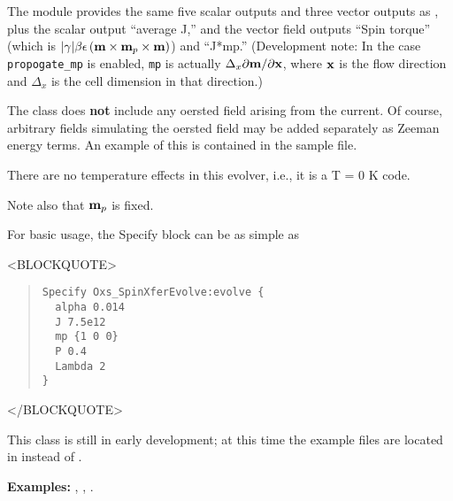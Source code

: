 \begin{description}
The  module provides the same five scalar
outputs and three vector outputs as , plus the
scalar output ``average J,'' and the vector field outputs ``Spin
torque'' (which is
$|\gamma|\beta\epsilon\left(\textbf{m}\times\textbf{m}_p\times\textbf{m}\right)$) and
``J*mp.''  (Development note: In the case \texttt{propogate\_mp} is
enabled, \texttt{mp} is actually $\Delta_x\partial\textbf{m}/\partial\textbf{x}$,
where $\textbf{x}$ is the flow direction and $\Delta_x$ is the cell dimension
in that direction.)

The  class does \textbf{not} include any oersted
field arising from the current.  Of course, arbitrary fields simulating
the oersted field may be added separately as Zeeman energy terms.  An
example of this is contained in the  sample file.

There are no temperature effects in this evolver, i.e., it is a T = 0 K
code.

Note also that $\textbf{m}_p$ is fixed.

For basic usage, the Specify block can be as simple as
\begin{rawhtml}<BLOCKQUOTE>\end{rawhtml}
\begin{quote}
\begin{verbatim}
Specify Oxs_SpinXferEvolve:evolve {
  alpha 0.014
  J 7.5e12
  mp {1 0 0}
  P 0.4
  Lambda 2
}\end{verbatim}
\end{quote}
\begin{rawhtml}</BLOCKQUOTE>\end{rawhtml}

This class is still in early development; at this time the example files
are located in  instead of
.

\textbf{Examples:} , ,
.


\end{description}
